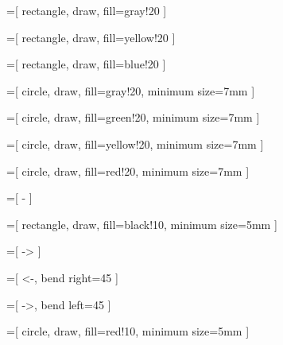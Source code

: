 
=[
	rectangle,
	draw,
	fill=gray!20
]

=[
	rectangle,
	draw,
	fill=yellow!20
]

=[
	rectangle,
	draw,
	fill=blue!20
]

=[
	circle,
	draw,
	fill=gray!20,
	minimum size=7mm
]

=[
	circle,
	draw,
	fill=green!20,
	minimum size=7mm
]

=[
	circle,
	draw,
	fill=yellow!20,
	minimum size=7mm
]

=[
	circle,
	draw,
	fill=red!20,
	minimum size=7mm
]

=[
	-
]

=[
	rectangle,
	draw,
	fill=black!10,
	minimum size=5mm
]

=[
	->
]

=[
	<-,
	bend right=45
]

=[
	->,
	bend left=45
]

=[
	circle,
	draw,
	fill=red!10,
	minimum size=5mm
]

\newcommand{\atomlegend}[2]{
	\node [rectangle,draw,fill=blue!20,minimum width=0.8cm] (body) at(#1,#2) {};
	\node [] (bodyLabel)							at(#1+1.4,#2)			{corps};
	\node [rectangle,draw,fill=yellow!20,minimum width=0.8cm] (head) at(#1,#2-0.5) {};
	\node [] (headLabel)							at(#1+1.4,#2-0.5)				{tête};
	\node [rectangle,draw,fill=green!20,minimum width=0.8cm] (fr) at(#1,#2-1) {};
	\node [] (frLabel)							at(#1+1.4,#2-1)				{frontière};
	\node [rectangle,draw,fill=red!20,minimum width=0.8cm] (cst) at(#1,#2-1.5) {};
	\node [] (cstLabel)							at(#1+1.4,#2-1.5)				{constantes};
}

\newcommand{\lightatomlegend}[2]{
	\node [rectangle,draw,fill=blue!20,minimum width=0.8cm] (body) at(#1,#2) {};
	\node [] (bodyLabel)							at(#1+1.4,#2)			{corps};
	\node [rectangle,draw,fill=yellow!20,minimum width=0.8cm] (head) at(#1,#2-0.5) {};
	\node [] (headLabel)							at(#1+1.4,#2-0.5)				{tête};
}


